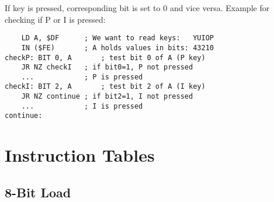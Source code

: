 \documentclass[oneside,a4paper]{book}
\begin{document}
If key is pressed, corresponding bit is set to 0 and vice versa. Example for checking if P or I is pressed:

\begin{Verbatim}
	LD A, $DF      ; We want to read keys:   YUIOP
	IN ($FE)       ; A holds values in bits: 43210
checkP: BIT 0, A       ; test bit 0 of A (P key)
	JR NZ checkI   ; if bit0=1, P not pressed
	...            ; P is pressed
checkI: BIT 2, A       ; test bit 2 of A (I key)
	JR NZ continue ; if bit2=1, I not pressed
	...            ; I is pressed
continue:
\end{Verbatim}




\chapter{Instruction Tables}

\newcommand{\instrheader}{
	\hline
		
		& 
		Symbolic &
		\multicolumn{8}{c}{Flags} & 
		\multicolumn{3}{c}{Opcode} &
		& & 
		M & 
		T & \\

		Mnemonic & 
		Operation &
		SF & ZF & YF & HF & XF & PF & NF & CF &
		76 & 543 & 210 & 
		Hex & Bytes & 
		Cycles & States & 
		Comments \\

	\hline
}

\setcounter{tocdepth}{2}
\startcontents[intrstructionsections]


\section{8-Bit Load}
\end{document}

